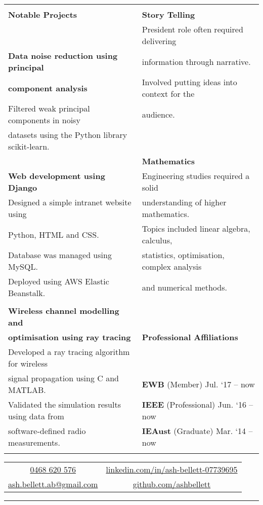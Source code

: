 \documentclass{letter}
\begin{document}
\begin{center}
\begin{tabularx}{\textwidth}{X | X}
	 \cline{1-1}
	 & \\
	\Large \textbf{Notable Projects} & \textbf{Story Telling}\\
	 & President role often required delivering\\
	\textbf{Data noise reduction using principal} & information through narrative.\\
	\textbf{component analysis} & Involved putting ideas into context for the\\
	Filtered weak principal components in noisy & audience.\\
	datasets using the Python library scikit-learn. & \\
	 & \textbf{Mathematics}\\
	\textbf{Web development using Django} & Engineering studies required a solid\\
	Designed a simple intranet website using & understanding of higher mathematics.\\
	Python, HTML and CSS. & Topics included linear algebra, calculus,\\
	Database was managed using MySQL. & statistics, optimisation, complex analysis\\
	Deployed using AWS Elastic Beanstalk. & and numerical methods.\\
	 & \\
	\cline{2-2}
	\textbf{Wireless channel modelling and} & \\
	\textbf{optimisation using ray tracing} & \Large \textbf{Professional Affiliations}\\
	Developed a ray tracing algorithm for wireless & \\
	signal propagation using C and MATLAB. & \textbf{EWB} (Member) \hfill Jul. `17 -- now\\
	Validated the simulation results using data from & \textbf{IEEE} (Professional) \hfill Jun. `16 -- now\\
	software-defined radio measurements. & \textbf{IEAust} (Graduate) \hfill Mar. `14 -- now\\
	 & \\
	\cline{1-1}
	\cline{2-2}
	\end{tabularx}
	\end{center}
	\begin{center}
	\begin{tabular}{cc}
	\href{tel:61468620576}{0468 620 576} & \href{https://www.linkedin.com/in/ash-bellett-07739695}{linkedin.com/in/ash-bellett-07739695}\\
	\href{mailto:ash.bellett.ab@gmail.com}{ash.bellett.ab@gmail.com} & \href{https://www.github.com/ashbellett}{github.com/ashbellett}
	\end{tabular}
	\end{center}
	\rule[4pt]{\textwidth}{4pt}
	
\end{document}
